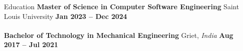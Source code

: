 \documentclass{resume}
\begin{document}
\vspace{-0.8em}
\begin{rSection}{Education}
\textbf{Master of Science in Computer Software Engineering} \textbar{} Saint Louis University \hfill \textbf{Jan 2023 -- Dec 2024}\\
\vspace{-1em}\\
\textbf{Bachelor of Technology in Mechanical Engineering}\textbar{} Griet, \textit{India}  \hfill \textbf{Aug 2017 -- Jul 2021}
\end{rSection}
\end{document}
